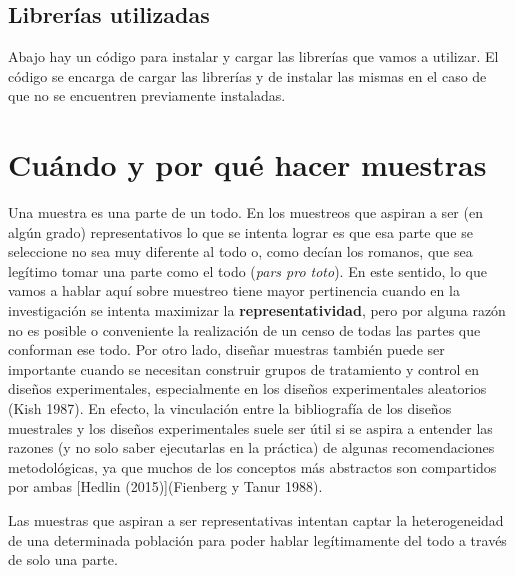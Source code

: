 \documentclass[
  spanish,
  a4paper,
]{scrreprt}
\begin{document}
\section{Librerías utilizadas}\label{libreruxedas-utilizadas}

Abajo hay un código para instalar y cargar las librerías que vamos a
utilizar. El código se encarga de cargar las librerías y de instalar las
mismas en el caso de que no se encuentren previamente instaladas.


\chapter{Cuándo y por qué hacer
muestras}\label{cuuxe1ndo-y-por-quuxe9-hacer-muestras}

Una muestra es una parte de un todo. En los muestreos que aspiran a ser
(en algún grado) representativos lo que se intenta lograr es que esa
parte que se seleccione no sea muy diferente al todo o, como decían los
romanos, que sea legítimo tomar una parte como el todo (\emph{pars pro
toto}). En este sentido, lo que vamos a hablar aquí sobre muestreo tiene
mayor pertinencia cuando en la investigación se intenta maximizar la
\textbf{representatividad}, pero por alguna razón no es posible o
conveniente la realización de un censo de todas las partes que conforman
ese todo. Por otro lado, diseñar muestras también puede ser importante
cuando se necesitan construir grupos de tratamiento y control en diseños
experimentales, especialmente en los diseños experimentales aleatorios
(Kish 1987). En efecto, la vinculación entre la bibliografía de los
diseños muestrales y los diseños experimentales suele ser útil si se
aspira a entender las razones (y no solo saber ejecutarlas en la
práctica) de algunas recomendaciones metodológicas, ya que muchos de los
conceptos más abstractos son compartidos por ambas {[}Hedlin
(2015){]}(Fienberg y Tanur 1988).

\begin{tcolorbox}[enhanced jigsaw, leftrule=.75mm, title=\textcolor{quarto-callout-note-color}{\faInfo}\hspace{0.5em}{Nota}, colframe=quarto-callout-note-color-frame, coltitle=black, breakable, opacityback=0, bottomtitle=1mm, opacitybacktitle=0.6, rightrule=.15mm, titlerule=0mm, toprule=.15mm, colbacktitle=quarto-callout-note-color!10!white, left=2mm, toptitle=1mm, bottomrule=.15mm, arc=.35mm, colback=white]

Las muestras que aspiran a ser representativas intentan captar la
heterogeneidad de una determinada población para poder hablar
legítimamente del todo a través de solo una parte.

\end{tcolorbox}
\end{document}
